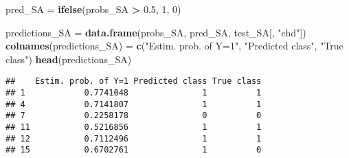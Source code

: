 \documentclass[10pt,ignorenonframetext,]{beamer}
\newenvironment{Shaded}{\begin{snugshade}}{\end{snugshade}}
\newcommand{\DecValTok}[1]{\textcolor[rgb]{0.00,0.00,0.81}{#1}}
\newcommand{\FloatTok}[1]{\textcolor[rgb]{0.00,0.00,0.81}{#1}}
\newcommand{\KeywordTok}[1]{\textcolor[rgb]{0.13,0.29,0.53}{\textbf{#1}}}
\newcommand{\NormalTok}[1]{#1}
\newcommand{\OperatorTok}[1]{\textcolor[rgb]{0.81,0.36,0.00}{\textbf{#1}}}
\newcommand{\StringTok}[1]{\textcolor[rgb]{0.31,0.60,0.02}{#1}}
\begin{document}
\begin{frame}[fragile]

\scriptsize

\begin{Shaded}
\begin{Highlighting}[]
\NormalTok{pred_SA =}\StringTok{ }\KeywordTok{ifelse}\NormalTok{(probs_SA }\OperatorTok{>}\StringTok{ }\FloatTok{0.5}\NormalTok{, }\DecValTok{1}\NormalTok{, }\DecValTok{0}\NormalTok{)}

\NormalTok{predictions_SA =}\StringTok{ }\KeywordTok{data.frame}\NormalTok{(probs_SA, pred_SA, test_SA[, }\StringTok{"chd"}\NormalTok{])}
\KeywordTok{colnames}\NormalTok{(predictions_SA) =}\StringTok{ }\KeywordTok{c}\NormalTok{(}\StringTok{"Estim. prob. of Y=1"}\NormalTok{, }\StringTok{"Predicted class"}\NormalTok{, }
    \StringTok{"True class"}\NormalTok{)}
\KeywordTok{head}\NormalTok{(predictions_SA)}
\end{Highlighting}
\end{Shaded}

\begin{verbatim}
##    Estim. prob. of Y=1 Predicted class True class
## 1            0.7741048               1          1
## 4            0.7141807               1          1
## 7            0.2258178               0          0
## 11           0.5216856               1          1
## 12           0.7112496               1          1
## 15           0.6702761               1          0
\end{verbatim}

\end{frame}
\end{document}
